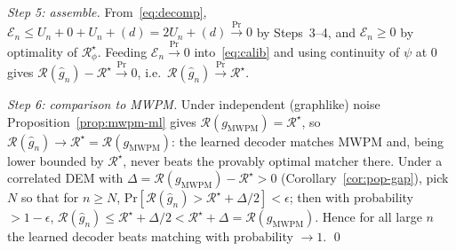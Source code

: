 \documentclass[aps,prxquantum,twocolumn,superscriptaddress,nofootinbib,longbibliography]{revtex4-2}
\newcommand{\PR}{\mathrm{Pr}}
\newcommand{\Risk}{\mathcal{R}}
\begin{document}
\emph{Step 5: assemble.}
From~\eqref{eq:decomp}, $\mathcal{E}_n\le U_n+0+U_n+(d)=2U_n+(d)
\xrightarrow{\PR}0$ by Steps~3--4, and $\mathcal{E}_n\ge 0$ by optimality of
$\Risk_\phi^\star$. Feeding $\mathcal{E}_n\xrightarrow{\PR}0$
into~\eqref{eq:calib} and using continuity of $\psi$ at $0$ gives
$\Risk(\hat g_n)-\Risk^\star\xrightarrow{\PR}0$, i.e.\ $\Risk(\hat g_n)
\xrightarrow{\PR}\Risk^\star$.

\emph{Step 6: comparison to MWPM.}
Under independent (graphlike) noise Proposition~\ref{prop:mwpm-ml} gives
$\Risk(g_{\mathrm{MWPM}})=\Risk^\star$, so $\Risk(\hat g_n)\to\Risk^\star=
\Risk(g_{\mathrm{MWPM}})$: the learned decoder matches MWPM and, being lower
bounded by $\Risk^\star$, never beats the provably optimal matcher there. Under a
correlated DEM with $\Delta=\Risk(g_{\mathrm{MWPM}})-\Risk^\star>0$
(Corollary~\ref{cor:pop-gap}), pick $N$ so that for $n\ge N$,
$\PR[\Risk(\hat g_n)>\Risk^\star+\Delta/2]<\epsilon$; then with probability
$>1-\epsilon$, $\Risk(\hat g_n)\le\Risk^\star+\Delta/2<\Risk^\star+\Delta=
\Risk(g_{\mathrm{MWPM}})$. Hence for all large $n$ the learned decoder beats
matching with probability $\to 1$.
\qed
\end{document}
